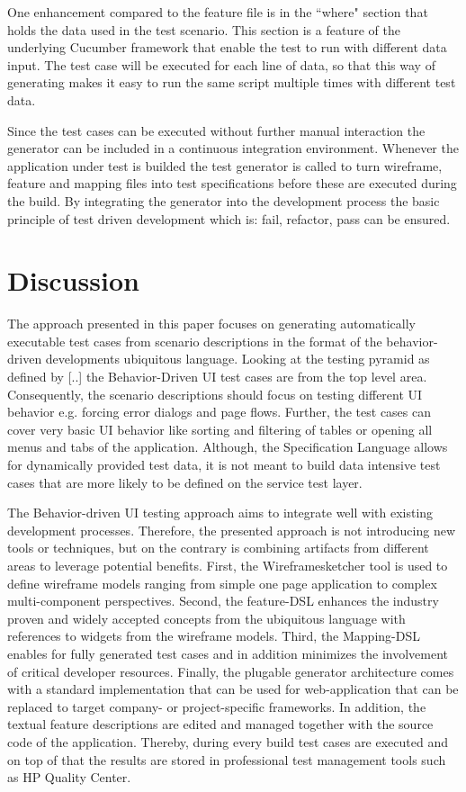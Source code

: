 \documentclass{sig-alternate-05-2015}
\begin{document}
One enhancement compared to the feature file is in the ``where" section that holds the data used in the test scenario.
This section is a feature of the underlying Cucumber framework that enable the test to run with different data input. 
The test case will be executed for each line of data, so that this way of generating makes it easy to run the same script multiple times with different test data.

Since the test cases can be executed without further manual interaction the generator can be included in a continuous integration environment.
Whenever the application under test is builded the test generator is called to turn wireframe, feature and mapping files into test specifications before these are executed during the build.
By integrating the generator into the development process the basic principle of test driven development which is: fail, refactor, pass can be ensured.

\section{Discussion}\label{sec:Discussion}
The approach presented in this paper focuses on generating automatically executable test cases from scenario descriptions in the format of the behavior-driven developments ubiquitous language.
Looking at the testing pyramid as defined by [..] the Behavior-Driven UI test cases are from the top level area.
Consequently, the scenario descriptions should focus on testing different UI behavior e.g. forcing error dialogs and page flows.
Further, the test cases can cover very basic UI behavior like sorting and filtering of tables or opening all menus and tabs of the application. 
Although, the Specification Language allows for dynamically provided test data, it is not meant to build data intensive test cases that are more likely to be defined on the service test layer.

The Behavior-driven UI testing approach aims to integrate well with existing development processes. 
Therefore, the presented approach is not introducing new tools or techniques, but on the contrary is combining artifacts from different areas to leverage potential benefits.
First, the Wireframesketcher tool is used to define wireframe models ranging from simple one page application to complex multi-component perspectives.
Second, the feature-DSL enhances the industry proven and widely accepted concepts from the ubiquitous language with references to widgets from the wireframe models.
Third, the Mapping-DSL enables for fully generated test cases and in addition minimizes the involvement of critical developer resources. 
Finally, the plugable generator architecture comes with a standard implementation that can be used for web-application that can be replaced to target company- or project-specific frameworks.
In addition, the textual feature descriptions are edited and managed together with the source code of the application.
Thereby, during every build test cases are executed and on top of that the results are stored in professional test management tools such as HP Quality Center.
\end{document}
